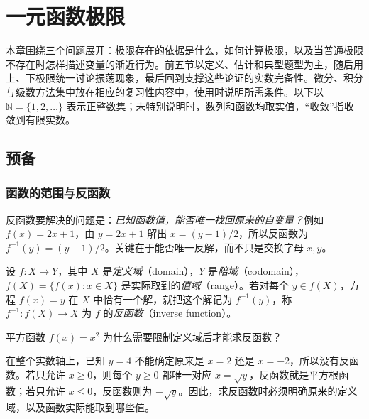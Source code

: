 \setcounter{chapter}{0} %
\chapter{一元函数极限}
\label{chap:peiliwen-limits}

本章围绕三个问题展开：极限存在的依据是什么，如何计算极限，以及当普通极限不存在时怎样描述变量的渐近行为。前五节以定义、估计和典型题型为主，随后用上、下极限统一讨论振荡现象，最后回到支撑这些论证的实数完备性。微分、积分与级数方法集中放在相应的复习性内容中，使用时说明所需条件。以下以 $\mathbb{N}=\{1,2,\ldots\}$ 表示正整数集；未特别说明时，数列和函数均取实值，“收敛”指收敛到有限实数。

\section{预备}
\label{sec:pei-preliminaries}

\subsection{函数的范围与反函数}
\label{subsec:pei-inverse-functions}

反函数要解决的问题是：\emph{已知函数值，能否唯一找回原来的自变量？}例如 $f(x)=2x+1$，由 $y=2x+1$ 解出 $x=(y-1)/2$，所以反函数为 $f^{-1}(y)=(y-1)/2$。关键在于能否唯一反解，而不只是交换字母 $x,y$。

\begin{definition}
\label{def:pei-inverse}
设 $f:X\to Y$，其中 $X$ 是\emph{定义域}（domain），$Y$ 是\emph{陪域}（codomain），$f(X)=\{f(x):x\in X\}$ 是实际取到的\emph{值域}（range）。若对每个 $y\in f(X)$，方程 $f(x)=y$ 在 $X$ 中恰有一个解，就把这个解记为 $f^{-1}(y)$，称 $f^{-1}:f(X)\to X$ 为 $f$ 的\emph{反函数}（inverse function）。
\end{definition}

\begin{example}
\label{ex:pei-square-inverse-domain}
平方函数 $f(x)=x^2$ 为什么需要限制定义域后才能求反函数？
\end{example}
\begin{solve}
在整个实数轴上，已知 $y=4$ 不能确定原来是 $x=2$ 还是 $x=-2$，所以没有反函数。若只允许 $x\ge0$，则每个 $y\ge0$ 都唯一对应 $x=\sqrt y$，反函数就是平方根函数；若只允许 $x\le0$，反函数则为 $-\sqrt y$。因此，求反函数时必须明确原来的定义域，以及函数实际能取到哪些值。
\end{solve}

